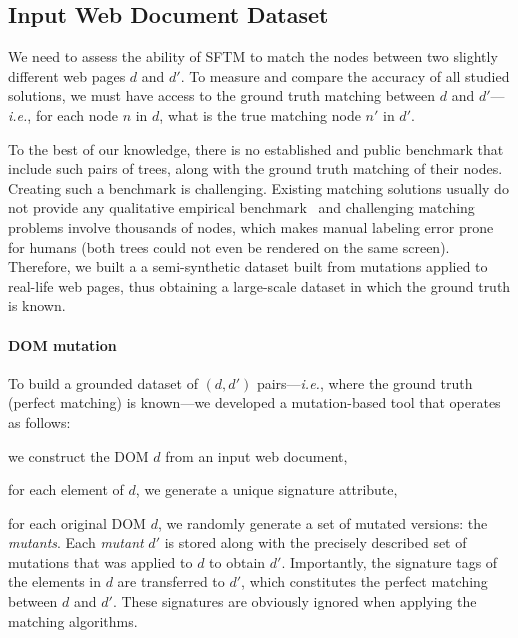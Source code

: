 \subsection{Input Web Document Dataset}
We need to assess the ability of SFTM to match the nodes between two slightly different web pages $d$ and $d'$.
To measure and compare the accuracy of all studied solutions, we must have access to the ground truth matching between $d$ and $d'$---\emph{i.e.}, for each node $n$ in $d$, what is the true matching node $n'$ in $d'$.

To the best of our knowledge, there is no established and public benchmark that include such pairs of trees, along with the ground truth matching of their nodes. Creating such a benchmark is challenging.
Existing matching solutions usually do not provide any qualitative empirical benchmark~\cite{Bunke1998ASubgraph,Dinitz1998OnIsomorphism, jiang1994alignment,valiente2001efficient,Wang2001FindingHierarchy,zhang1995algorithms} and challenging matching problems involve thousands of nodes, which makes manual labeling error prone for humans (both trees could not even be rendered on the same screen).
Therefore, we built a a semi-synthetic dataset built from mutations applied to real-life web pages, thus obtaining a large-scale dataset in which the ground truth is known.

\paragraph{DOM mutation}
To build a grounded dataset of $(d,d')$ pairs---\emph{i.e.}, where the ground truth (perfect matching) is known---we developed a mutation-based tool that operates as follows:
\begin{compactenum}
	\item we construct the DOM $d$ from an input web document,
    \item for each element of $d$, we generate a unique signature attribute,
    \item for each original DOM $d$, we randomly generate a set of mutated versions: the \textit{mutants}.
    Each \textit{mutant} $d'$ is stored along with the precisely described set of mutations that was applied to $d$ to obtain $d'$.
    Importantly, the signature tags of the elements in $d$ are transferred to $d'$, which constitutes the perfect matching between $d$ and $d'$. These signatures are obviously ignored when applying the matching algorithms.
\end{compactenum}

